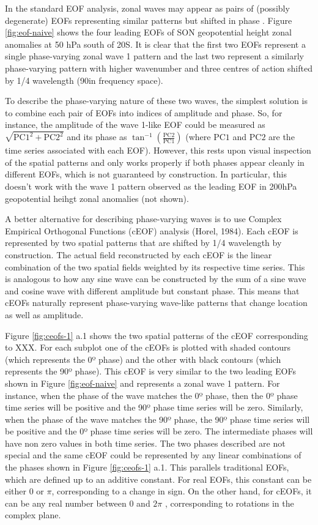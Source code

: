 \documentclass[pdflatex,sn-basic]{sn-jnl}
\theoremstyle{thmstyleone}%
\theoremstyle{thmstyletwo}%
\theoremstyle{thmstylethree}%
\begin{document}
In the standard EOF analysis, zonal waves may appear as pairs of (possibly degenerate) EOFs representing similar patterns but shifted in phase \citep{horel1984}.
Figure \ref{fig:eof-naive} shows the four leading EOFs of SON geopotential height zonal anomalies at 50 hPa south of 20\degree S.
It is clear that the first two EOFs represent a single phase-varying zonal wave 1 pattern and the last two represent a similarly phase-varying pattern with higher wavenumber and three centres of action shifted by 1/4 wavelength (90\degree in frequency space).

To describe the phase-varying nature of these two waves, the simplest solution is to combine each pair of EOFs into indices of amplitude and phase.
So, for instance, the amplitude of the wave 1-like EOF could be measured as \(\sqrt{\mathrm{PC1}^2 + \mathrm{PC2}^2}\) and its phase as \(\tan^{-1} \left ( \frac{\mathrm{PC2}}{\mathrm{PC1}} \right )\) (where \(\mathrm{PC1}\) and \(\mathrm{PC2}\) are the time series associated with each EOF).
However, this rests upon visual inspection of the spatial patterns and only works properly if both phases appear cleanly in different EOFs, which is not guaranteed by construction.
In particular, this doesn't work with the wave 1 pattern observed as the leading EOF in 200hPa geopotential heihgt zonal anomalies (not shown).

A better alternative for describing phase-varying waves is to use Complex Empirical Orthogonal Functions (cEOF) analysis (Horel, 1984).
Each cEOF is represented by two spatial patterns that are shifted by 1/4 wavelength by construction.
The actual field reconstructed by each cEOF is the linear combination of the two spatial fields weighted by its respective time series.
This is analogous to how any sine wave can be constructed by the sum of a sine wave and cosine wave with different amplitude but constant phase.
This means that cEOFs naturally represent phase-varying wave-like patterns that change location as well as amplitude.

Figure \ref{fig:ceofs-1} a.1 shows the two spatial patterns of the cEOF corresponding to XXX.
For each subplot one of the cEOFs is plotted with shaded contours (which represents the 0º phase) and the other with black contours (which represents the 90º phase).
This cEOF is very similar to the two leading EOFs shown in Figure \ref{fig:eof-naive} and represents a zonal wave 1 pattern.
For instance, when the phase of the wave matches the 0º phase, then the 0º phase time series will be positive and the 90º phase time series will be zero.
Similarly, when the phase of the wave matches the 90º phase, the 90º phase time series will be positive and the 0º phase time series will be zero.
The intermediate phases will have non zero values in both time series.
The two phases described are not special and the same cEOF could be represented by any linear combinations of the phases shown in Figure \ref{fig:ceofs-1} a.1.
This parallels traditional EOFs, which are defined up to an additive constant.
For real EOFs, this constant can be either 0 or \(\pi\), corresponding to a change in sign. On the other hand, for cEOFs, it can be any real number between 0 and \(2\pi\) \citep{horel1984}, corresponding to rotations in the complex plane.
\end{document}
